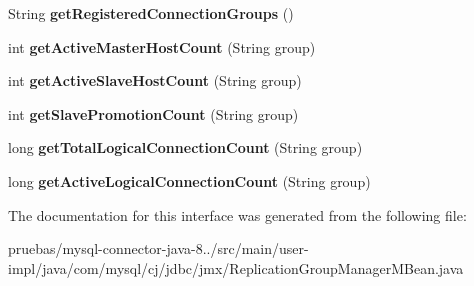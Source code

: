 \begin{DoxyCompactItemize}
String {\bfseries get\+Registered\+Connection\+Groups} ()
\item 
\mbox{\label{interfacecom_1_1mysql_1_1cj_1_1jdbc_1_1jmx_1_1_replication_group_manager_m_bean_a8fcb4874b474966e00f7491a9047abcf}} 
int {\bfseries get\+Active\+Master\+Host\+Count} (String group)
\item 
\mbox{\label{interfacecom_1_1mysql_1_1cj_1_1jdbc_1_1jmx_1_1_replication_group_manager_m_bean_a79963dacad26e5d118a7972775702d39}} 
int {\bfseries get\+Active\+Slave\+Host\+Count} (String group)
\item 
\mbox{\label{interfacecom_1_1mysql_1_1cj_1_1jdbc_1_1jmx_1_1_replication_group_manager_m_bean_abdb36e1691dfb3ef8281ae8b2d13150f}} 
int {\bfseries get\+Slave\+Promotion\+Count} (String group)
\item 
\mbox{\label{interfacecom_1_1mysql_1_1cj_1_1jdbc_1_1jmx_1_1_replication_group_manager_m_bean_a3ed13df24179ef8319709f279d9b05f0}} 
long {\bfseries get\+Total\+Logical\+Connection\+Count} (String group)
\item 
\mbox{\label{interfacecom_1_1mysql_1_1cj_1_1jdbc_1_1jmx_1_1_replication_group_manager_m_bean_acc828b885c01219278f3ecbd429c5476}} 
long {\bfseries get\+Active\+Logical\+Connection\+Count} (String group)
\end{DoxyCompactItemize}


The documentation for this interface was generated from the following file\+:\begin{DoxyCompactItemize}
\item 
pruebas/mysql-\/connector-\/java-\/8../src/main/user-\/impl/java/com/mysql/cj/jdbc/jmx/Replication\+Group\+Manager\+M\+Bean.\+java\end{DoxyCompactItemize}
